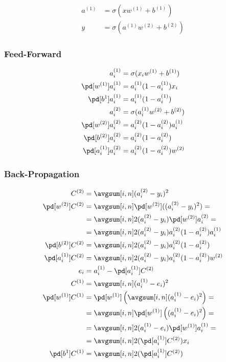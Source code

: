 \documentclass{article}
\begin{document}
\begin{align}
  a^{(1)} &= \sigma(xw^{(1)} + b^{(1)}) \\
  y &= \sigma(a^{(1)}w^{(2)} + b^{(2)})
\end{align}

\subsubsection{Feed-Forward}

\begin{align}
  a_i^{(1)} &= \sigma(x_iw^{(1)} + b^{(1)}) \\
  \pd[w^{(1)}]a_i^{(1)} &= a_i^{(1)}(1 - a_i^{(1)})x_i \\
  \pd[b^{1}]a_i^{(1)} &= a_i^{(1)}(1 - a_i^{(1)}) \\
  a_i^{(2)} &= \sigma(a_i^{(1)}w^{(2)} + b^{(2)}) \\
  \pd[w^{(2)}]a_i^{(2)} &= a_i^{(2)}(1 - a_i^{(2)})a_i^{(1)} \\
  \pd[b^{(2)}]a_i^{(2)} &= a_i^{(2)}(1 - a_i^{(2)}) \\
  \pd[a_i^{(1)}]a_i^{(2)} &= a_i^{(2)}(1 - a_i^{(2)})w^{(2)}
\end{align}

\subsubsection{Back-Propagation}

\begin{align}
  C^{(2)} &= \avgsum[i, n] (a_i^{(2)} - y_i)^2 \\
  \pd[w^{(2)}] C^{(2)}
            &= \avgsum[i, n] \pd[w^{(2)}]((a_i^{(2)} - y_i)^2) = \\
            &= \avgsum[i, n] 2(a_i^{(2)} - y_i)\pd[w^{(2)}]a_i^{(2)} = \\
            &= \avgsum[i, n] 2(a_i^{(2)} - y_i)a_i^{(2)}(1 - a_i^{(2)})a_i^{(1)} \\
  \pd[b^{(2)}] C^{(2)} &= \avgsum[i, n] 2(a_i^{(2)} - y_i)a_i^{(2)}(1 - a_i^{(2)}) \\
  \pd[a_i^{(1)}]C^{(2)} &= \avgsum[i, n] 2(a_i^{(2)} - y_i)a_i^{(2)}(1 - a_i^{(2)})w^{(2)} \\
  e_i &= a_i^{(1)} - \pd[a_i^{(1)}]C^{(2)} \\
  C^{(1)} &= \avgsum[i, n] (a_i^{(1)} - e_i)^2 \\
  \pd[w^{(1)}]C^{(1)}
            &= \pd[w^{(1)}]\left(\avgsum[i, n] (a_i^{(1)} - e_i)^2\right) =\\
            &= \avgsum[i, n] \pd[w^{(1)}]\left((a_i^{(1)} - e_i)^2\right) =\\
            &= \avgsum[i, n] 2(a_i^{(1)} - e_i)\pd[w^{(1)}]a_i^{(1)} =\\
            &= \avgsum[i, n] 2(\pd[a_i^{(1)}]C^{(2)})x_i \\
  \pd[b^{1}]C^{(1)} &= \avgsum[i, n] 2(\pd[a_i^{(1)}]C^{(2)})
\end{align}
\end{document}
